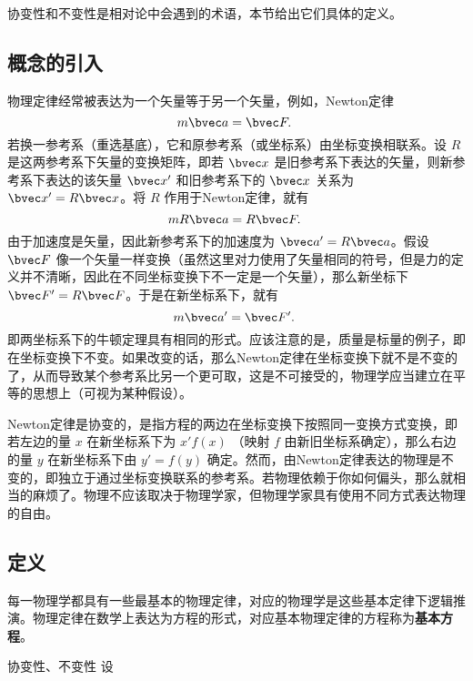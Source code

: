 
协变性和不变性是相对论中会遇到的术语，本节给出它们具体的定义。
\subsection{概念的引入}
物理定律经常被表达为一个矢量等于另一个矢量，例如，Newton定律 
\begin{equation}
m\bvec a=\bvec F.~
\end{equation}
若换一参考系（重选基底），它和原参考系（或坐标系）由坐标变换相联系。设 $R$ 是这两参考系下矢量的变换矩阵，即若 $\bvec x$ 是旧参考系下表达的矢量，则新参考系下表达的该矢量 $\bvec x'$ 和旧参考系下的 $\bvec x$ 关系为 $\bvec x'=R\bvec x$。将 $R$ 作用于Newton定律，就有
\begin{equation}
mR\bvec a=R\bvec F.~
\end{equation}
由于加速度是矢量，因此新参考系下的加速度为 $\bvec a'=R\bvec a$。假设 $\bvec F$ 像一个矢量一样变换（虽然这里对力使用了矢量相同的符号，但是力的定义并不清晰，因此在不同坐标变换下不一定是一个矢量），那么新坐标下 $\bvec F'=R\bvec F$。于是在新坐标系下，就有
\begin{equation}
m\bvec a'=\bvec F'.~
\end{equation}
即两坐标系下的牛顿定理具有相同的形式。应该注意的是，质量是标量的例子，即在坐标变换下不变。如果改变的话，那么Newton定律在坐标变换下就不是不变的了，从而导致某个参考系比另一个更可取，这是不可接受的，物理学应当建立在平等的思想上（可视为某种假设）。

Newton定律是协变的，是指方程的两边在坐标变换下按照同一变换方式变换，即若左边的量 $x$ 在新坐标系下为 $x'f(x)$ （映射 $f$ 由新旧坐标系确定），那么右边的量 $y$ 在新坐标系下由 $y'=f(y)$ 确定。然而，由Newton定律表达的物理是不变的，即独立于通过坐标变换联系的参考系。若物理依赖于你如何偏头，那么就相当的麻烦了。物理不应该取决于物理学家，但物理学家具有使用不同方式表达物理的自由。

\subsection{定义}
每一物理学都具有一些最基本的物理定律，对应的物理学是这些基本定律下逻辑推演。物理定律在数学上表达为方程的形式，对应基本物理定律的方程称为\textbf{基本方程}。
\begin{definition}{协变性、不变性}
设
\end{definition}















